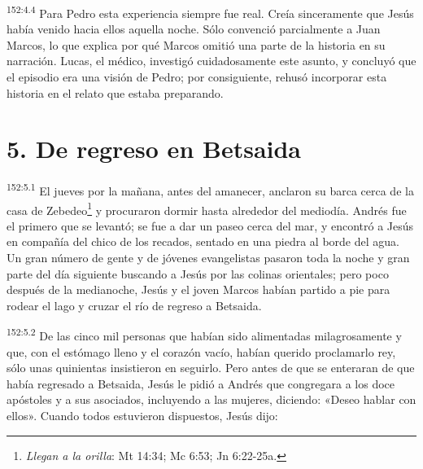 \par 
\textsuperscript{152:4.4} Para Pedro esta experiencia siempre fue real. Creía sinceramente que Jesús había venido hacia ellos aquella noche. Sólo convenció parcialmente a Juan Marcos, lo que explica por qué Marcos omitió una parte de la historia en su narración. Lucas, el médico, investigó cuidadosamente este asunto, y concluyó que el episodio era una visión de Pedro; por consiguiente, rehusó incorporar esta historia en el relato que estaba preparando.

\section*{5. De regreso en Betsaida}
\par 
\textsuperscript{152:5.1} El jueves por la mañana, antes del amanecer, anclaron su barca cerca de la casa de Zebedeo\footnote{\textit{Llegan a la orilla}: Mt 14:34; Mc 6:53; Jn 6:22-25a.} y procuraron dormir hasta alrededor del mediodía. Andrés fue el primero que se levantó; se fue a dar un paseo cerca del mar, y encontró a Jesús en compañía del chico de los recados, sentado en una piedra al borde del agua. Un gran número de gente y de jóvenes evangelistas pasaron toda la noche y gran parte del día siguiente buscando a Jesús por las colinas orientales; pero poco después de la medianoche, Jesús y el joven Marcos habían partido a pie para rodear el lago y cruzar el río de regreso a Betsaida.

\par 
\textsuperscript{152:5.2} De las cinco mil personas que habían sido alimentadas milagrosamente y que, con el estómago lleno y el corazón vacío, habían querido proclamarlo rey, sólo unas quinientas insistieron en seguirlo. Pero antes de que se enteraran de que había regresado a Betsaida, Jesús le pidió a Andrés que congregara a los doce apóstoles y a sus asociados, incluyendo a las mujeres, diciendo: «Deseo hablar con ellos». Cuando todos estuvieron dispuestos, Jesús dijo:

